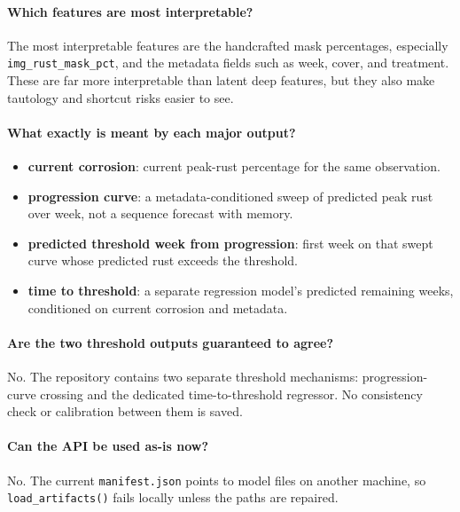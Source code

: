 \documentclass[11pt]{article}
\begin{document}
\paragraph{Which features are most interpretable?}
The most interpretable features are the handcrafted mask percentages, especially \texttt{img\_rust\_mask\_pct}, and the metadata fields such as week, cover, and treatment. These are far more interpretable than latent deep features, but they also make tautology and shortcut risks easier to see.

\paragraph{What exactly is meant by each major output?}
\begin{itemize}
  \item \textbf{current corrosion}: current peak-rust percentage for the same observation.
  \item \textbf{progression curve}: a metadata-conditioned sweep of predicted peak rust over week, not a sequence forecast with memory.
  \item \textbf{predicted threshold week from progression}: first week on that swept curve whose predicted rust exceeds the threshold.
  \item \textbf{time to threshold}: a separate regression model's predicted remaining weeks, conditioned on current corrosion and metadata.
\end{itemize}

\paragraph{Are the two threshold outputs guaranteed to agree?}
No. The repository contains two separate threshold mechanisms: progression-curve crossing and the dedicated time-to-threshold regressor. No consistency check or calibration between them is saved.

\paragraph{Can the API be used as-is now?}
No. The current \texttt{manifest.json} points to model files on another machine, so \texttt{load\_artifacts()} fails locally unless the paths are repaired.
\end{document}
